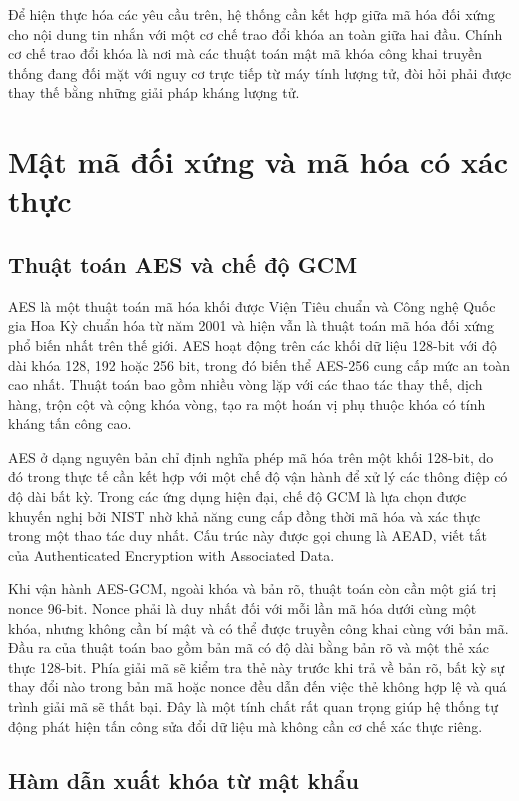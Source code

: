 Để hiện thực hóa các yêu cầu trên, hệ thống cần kết hợp giữa mã hóa đối xứng cho nội dung tin nhắn với một cơ chế trao đổi khóa an toàn giữa hai đầu. Chính cơ chế trao đổi khóa là nơi mà các thuật toán mật mã khóa công khai truyền thống đang đối mặt với nguy cơ trực tiếp từ máy tính lượng tử, đòi hỏi phải được thay thế bằng những giải pháp kháng lượng tử.

\section{Mật mã đối xứng và mã hóa có xác thực}

\subsection{Thuật toán AES và chế độ GCM}

AES là một thuật toán mã hóa khối được Viện Tiêu chuẩn và Công nghệ Quốc gia Hoa Kỳ chuẩn hóa từ năm 2001 và hiện vẫn là thuật toán mã hóa đối xứng phổ biến nhất trên thế giới. AES hoạt động trên các khối dữ liệu 128-bit với độ dài khóa 128, 192 hoặc 256 bit, trong đó biến thể AES-256 cung cấp mức an toàn cao nhất. Thuật toán bao gồm nhiều vòng lặp với các thao tác thay thế, dịch hàng, trộn cột và cộng khóa vòng, tạo ra một hoán vị phụ thuộc khóa có tính kháng tấn công cao.

AES ở dạng nguyên bản chỉ định nghĩa phép mã hóa trên một khối 128-bit, do đó trong thực tế cần kết hợp với một chế độ vận hành để xử lý các thông điệp có độ dài bất kỳ. Trong các ứng dụng hiện đại, chế độ GCM là lựa chọn được khuyến nghị bởi NIST nhờ khả năng cung cấp đồng thời mã hóa và xác thực trong một thao tác duy nhất. Cấu trúc này được gọi chung là AEAD, viết tắt của Authenticated Encryption with Associated Data.

Khi vận hành AES-GCM, ngoài khóa và bản rõ, thuật toán còn cần một giá trị nonce 96-bit. Nonce phải là duy nhất đối với mỗi lần mã hóa dưới cùng một khóa, nhưng không cần bí mật và có thể được truyền công khai cùng với bản mã. Đầu ra của thuật toán bao gồm bản mã có độ dài bằng bản rõ và một thẻ xác thực 128-bit. Phía giải mã sẽ kiểm tra thẻ này trước khi trả về bản rõ, bất kỳ sự thay đổi nào trong bản mã hoặc nonce đều dẫn đến việc thẻ không hợp lệ và quá trình giải mã sẽ thất bại. Đây là một tính chất rất quan trọng giúp hệ thống tự động phát hiện tấn công sửa đổi dữ liệu mà không cần cơ chế xác thực riêng.

\subsection{Hàm dẫn xuất khóa từ mật khẩu}


